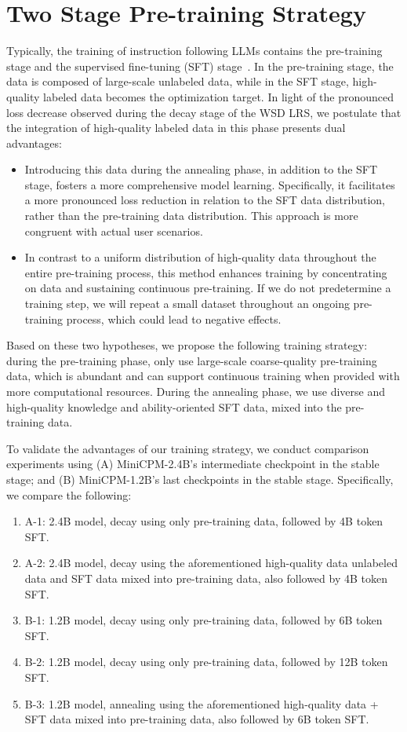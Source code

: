 
\section{Two Stage Pre-training Strategy}
\label{sec:trainingstrategy}
Typically, the training of instruction following LLMs contains the pre-training stage and the supervised fine-tuning (SFT) stage~\citep{zhang2023instruction,wei2021finetuned}. In the pre-training stage, the data is composed of large-scale unlabeled data, while in the SFT stage, high-quality labeled data becomes the optimization target. 
In light of the pronounced loss decrease observed during the decay stage of the WSD LRS, we postulate that the integration of high-quality labeled data in this phase presents dual advantages:
\begin{itemize}
    \item Introducing this data during the annealing phase, in addition to the SFT stage, fosters a more comprehensive model learning. Specifically, it facilitates a more pronounced loss reduction in relation to the SFT data distribution, rather than the pre-training data distribution. This approach is more congruent with actual user scenarios.
    \item In contrast to a uniform distribution of high-quality data throughout the entire pre-training process, this method enhances training by concentrating on data and sustaining continuous pre-training. If we do not predetermine a training step, we will repeat a small dataset throughout an ongoing pre-training process, which could lead to negative effects.
\end{itemize}

Based on these two hypotheses, we propose the following training strategy: during the pre-training phase, only use large-scale coarse-quality pre-training data, which is abundant and can support continuous training when provided with more computational resources. During the annealing phase, we use diverse and high-quality knowledge and ability-oriented SFT data, mixed into the pre-training data.

To validate the advantages of our training strategy, we conduct comparison experiments using (A) MiniCPM-2.4B's intermediate checkpoint in the stable stage; and (B) MiniCPM-1.2B's last checkpoints in the stable stage. Specifically, we compare the following:

\begin{enumerate}
    \item A-1: 2.4B model, decay using only pre-training data, followed by 4B token SFT.
    \item A-2: 2.4B model, decay using the aforementioned high-quality data unlabeled data and SFT data mixed into pre-training data, also followed by 4B token SFT.
    \item B-1: 1.2B model, decay using only pre-training data, followed by 6B token SFT.
    \item B-2: 1.2B model, decay using only pre-training data, followed by 12B token SFT.
    \item B-3: 1.2B model, annealing using the aforementioned high-quality data + SFT data mixed into pre-training data, also followed by 6B token SFT. 
\end{enumerate}



